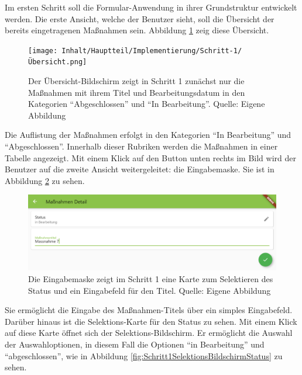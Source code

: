 

Im ersten Schritt soll die Formular-Anwendung  in ihrer Grundstruktur entwickelt werden. Die erste Ansicht, welche der Benutzer sieht, soll die Übersicht der bereits eingetragenen Maßnahmen sein. Abbildung \ref{fig:Schritt1Uebersicht} zeig diese Übersicht. 
\begin{figure}[H]
	\centering
    \texttt{[image: Inhalt/Hauptteil/Implementierung/Schritt-1/Übersicht.png]}
	\caption[Schritt 1 Übersicht]{Der Übersicht-Bildschirm zeigt in  Schritt 1 zunächst nur die Maßnahmen mit ihrem Titel und Bearbeitungsdatum in den Kategorien \enquote{Abgeschlossen} und \enquote{In Bearbeitung}. Quelle: Eigene Abbildung}
	\label{fig:Schritt1Uebersicht}
\end{figure} 
Die Auflistung der Maßnahmen erfolgt in den Kategorien \enquote{In Bearbeitung} und \enquote{Abgeschlossen}. Innerhalb dieser Rubriken werden die Maßnahmen in einer Tabelle angezeigt. Mit einem Klick auf den Button unten rechts im Bild wird der Benutzer auf die zweite Ansicht weitergeleitet: die Eingabemaske. Sie ist in Abbildung \ref{fig:Schritt1Eingabemaske} zu sehen.
\begin{figure}[H]
	\centering
    \includegraphics[width=1.0\textwidth]{Inhalt/Hauptteil/Implementierung/Schritt-1/Eingabemaske.png}
	\caption[Schritt 1 Eingabemaske]{Die Eingabemaske zeigt im Schritt 1 eine Karte zum Selektieren des Status und ein Eingabefeld für den Titel. Quelle: Eigene Abbildung}
	\label{fig:Schritt1Eingabemaske}
\end{figure} 
Sie ermöglicht die Eingabe des Maßnahmen-Titels über ein simples Eingabefeld. Darüber hinaus ist die Selektions-Karte für den Status zu sehen. Mit einem Klick auf diese Karte öffnet sich der Selektions-Bildschirm. Er ermöglicht die Auswahl der Auswahloptionen, in diesem Fall die Optionen \enquote{in Bearbeitung} und \enquote{abgeschlossen}, wie in Abbildung \ref{fig:Schritt1SelektionsBildschirmStatus} zu sehen.
